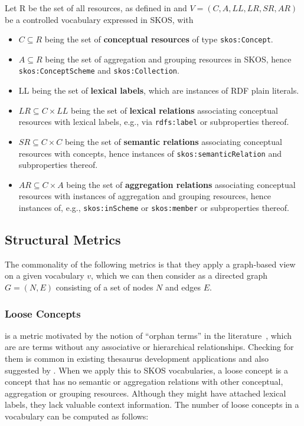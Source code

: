\begin{definition} Let R be the set of all resources, as defined in \cite{Jacobs2004} and $V = (C, A, LL, LR, SR, AR)$ be a controlled vocabulary expressed in SKOS, with

\begin{itemize}
	\item \(C \subseteq R\) being the set of \textbf{conceptual resources} of type \texttt{skos:Concept}.
	\item \(A \subseteq R\) being the set of aggregation and grouping resources in SKOS, hence \texttt{skos:ConceptScheme} and \texttt{skos:Collection}.
	\item LL being the set of \textbf{lexical labels}, which are instances of RDF plain literals.
	\item \(LR \subseteq C \times LL\) being the set of \textbf{lexical relations} associating conceptual resources with lexical labels, e.g., via \texttt{rdfs:label} or subproperties thereof. 
\item \(SR \subseteq C \times C\) being the set of \textbf{semantic relations} associating conceptual resources with concepts, hence instances of \texttt{skos:semanticRelation} and subproperties thereof.
\item \(AR \subseteq C \times A\) being the set of \textbf{aggregation relations} associating conceptual resources with instances of aggregation and grouping resources, hence instances of, e.g., \texttt{skos:inScheme} or \texttt{skos:member} or subproperties thereof.
\end{itemize}

\end{definition}


\subsection{Structural Metrics}

The commonality of the following metrics is that they apply a graph-based view on a given vocabulary \(v\), which we can then consider as a directed graph \(G=(N,E)\) consisting of a set of nodes \(N\) and edges \(E\).

\subsubsection{Loose Concepts} is a metric motivated by the notion of ``orphan terms''  in the literature~\cite{Hedden2010}, which are are terms without any associative or hierarchical relationships. Checking for them is common in existing thesaurus development applications and also suggested by \cite{Z39.19:2005}. When we apply this to SKOS vocabularies, a loose concept is a concept that has no semantic or aggregation relations with other conceptual, aggregation or grouping resources. Although they might have attached lexical labels, they lack valuable context information. The number of loose concepts in a vocabulary can be computed as follows:

